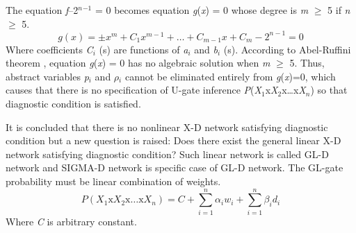 \documentclass{article}
\numberwithin{equation}{section}
\numberwithin{figure}{section}
\numberwithin{table}{section}
\begin{document}
The equation \textit{f}--2\textit{${}^{n}$}${}^{-1}$ = 0 becomes equation \textit{g}(\textit{x}) = 0 whose degree is \textit{m} $\mathrm{\ge}$ 5 if \textit{n }$\mathrm{\ge}$ 5.
\[g\left(x\right)=\pm x^m+C_1x^{m-1}+\dots +C_{m-1}x+C_m-2^{n-1}=0\] 
Where coefficients \textit{C${}_{i}$} (s) are functions of \textit{a${}_{i}$} and \textit{b${}_{i}$} (s). According to Abel-Ruffini theorem \cite{wikipedia:abel-ruffini}, equation \textit{g}(\textit{x}) = 0 has no algebraic solution when \textit{m} $\mathrm{\ge}$ 5. Thus, abstract variables \textit{p${}_{i}$} and \textit{$\rho$${}_{i}$} cannot be eliminated entirely from \textit{g}(\textit{x})=0, which causes that there is no specification of U-gate inference \textit{P}(\textit{X}${}_{1}$x\textit{X}${}_{2}$x{\dots}x\textit{X${}_{n}$}) so that diagnostic condition is satisfied.

It is concluded that there is no nonlinear X-D network satisfying diagnostic condition but a new question is raised: Does there exist the general linear X-D network satisfying diagnostic condition? Such linear network is called GL-D network and SIGMA-D network is specific case of GL-D network. The GL-gate probability must be linear combination of weights.
\[P\left(X_1\mathrm{x}X_2\mathrm{x}\dots \mathrm{x}X_n\right)=C+\sum^n_{i=1}{{\alpha }_iw_i}+\sum^n_{i=1}{{\beta }_id_i}\] 
Where \textit{C} is arbitrary constant.
\end{document}
